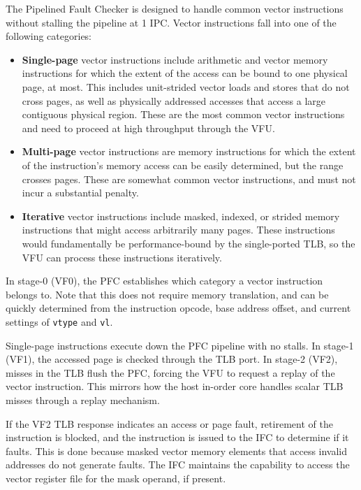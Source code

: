 The Pipelined Fault Checker is designed to handle common vector instructions without stalling the pipeline at 1 IPC.
Vector instructions fall into one of the following categories:

\begin{itemize}
\item \textbf{Single-page} vector instructions include arithmetic and vector memory instructions for which the extent of the access can be bound to one physical page, at most. This includes unit-strided vector loads and stores that do not cross pages, as well as physically addressed accesses that access a large contiguous physical region. These are the most common vector instructions and need to proceed at high throughput through the VFU.
\item \textbf{Multi-page} vector instructions are memory instructions for which the extent of the instruction's memory access can be easily determined, but the range crosses pages. These are somewhat common vector instructions, and must not incur a substantial penalty.
\item \textbf{Iterative} vector instructions include masked, indexed, or strided memory instructions that might access arbitrarily many pages. These instructions would fundamentally be performance-bound by the single-ported TLB, so the VFU can process these instructions iteratively.
\end{itemize}

In stage-0 (VF0), the PFC establishes which category a vector instruction belongs to.
Note that this does not require memory translation, and can be quickly determined from the instruction opcode, base address offset, and current settings of \texttt{vtype} and \texttt{vl}.

Single-page instructions execute down the PFC pipeline with no stalls.
In stage-1 (VF1), the accessed page is checked through the TLB port.
In stage-2 (VF2), misses in the TLB flush the PFC, forcing the VFU to request a replay of the vector instruction.
This mirrors how the host in-order core handles scalar TLB misses through a replay mechanism.

If the VF2 TLB response indicates an access or page fault, retirement of the instruction is blocked, and the instruction is issued to the IFC to determine if it faults.
This is done because masked vector memory elements that access invalid addresses do not generate faults.
The IFC maintains the capability to access the vector register file for the mask operand, if present.

